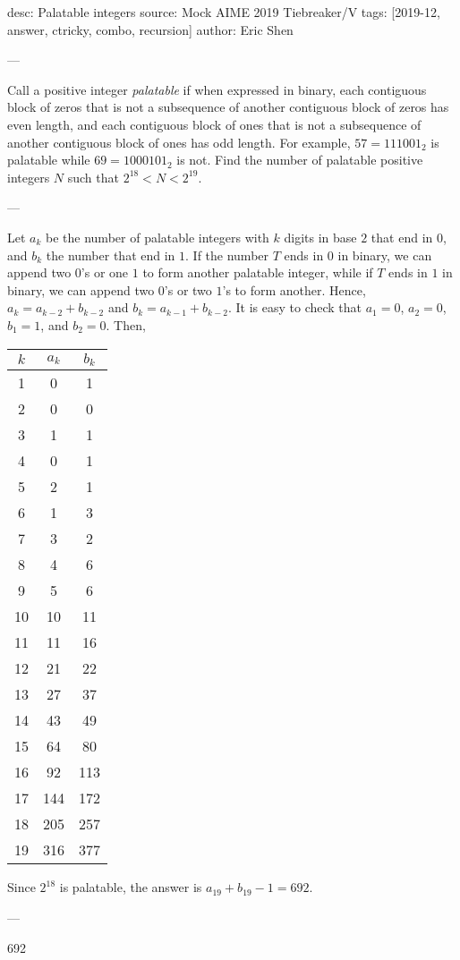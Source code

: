desc: Palatable integers
source: Mock AIME 2019 Tiebreaker/V
tags: [2019-12, answer, ctricky, combo, recursion]
author: Eric Shen

---

Call a positive integer \textit{palatable} if when expressed in binary, each contiguous block of zeros that is not a subsequence of another contiguous block of zeros has even length, and each contiguous block of ones that is not a subsequence of another contiguous block of ones has odd length. For example, $57=111001_2$ is palatable while $69=1000101_2$ is not. Find the number of palatable positive integers $N$ such that $2^{18}<N<2^{19}$.

---

Let $a_k$ be the number of palatable integers with $k$ digits in base $2$ that end in $0$, and $b_k$ the number that end in $1$. If the number $T$ ends in $0$ in binary, we can append two $0$'s or one $1$ to form another palatable integer, while if $T$ ends in $1$ in binary, we can append two $0$'s or two $1$'s to form another. Hence, $a_k=a_{k-2}+b_{k-2}$ and $b_k=a_{k-1}+b_{k-2}$. It is easy to check that $a_1=0$, $a_2=0$, $b_1=1$, and $b_2=0$. Then,
\begin{center}
    \begin{tabular}{c|c|c}
        $k$ & $a_k$ & $b_k$ \\ \hline
        1 & 0 & 1 \\
        2 & 0 & 0 \\
        3 & 1 & 1 \\
        4 & 0 & 1 \\
        5 & 2 & 1 \\
        6 & 1 & 3 \\
        7 & 3 & 2 \\
        8 & 4 & 6 \\
        9 & 5 & 6 \\
        10 & 10 & 11 \\
        11 & 11 & 16 \\
        12 & 21 & 22 \\
        13 & 27 & 37 \\
        14 & 43 & 49 \\
        15 & 64 & 80 \\
        16 & 92 & 113 \\
        17 & 144 & 172 \\
        18 & 205 & 257 \\
        19 & 316 & 377
    \end{tabular}
\end{center}
Since $2^{18}$ is palatable, the answer is $a_{19}+b_{19}-1=692$.

---

692
